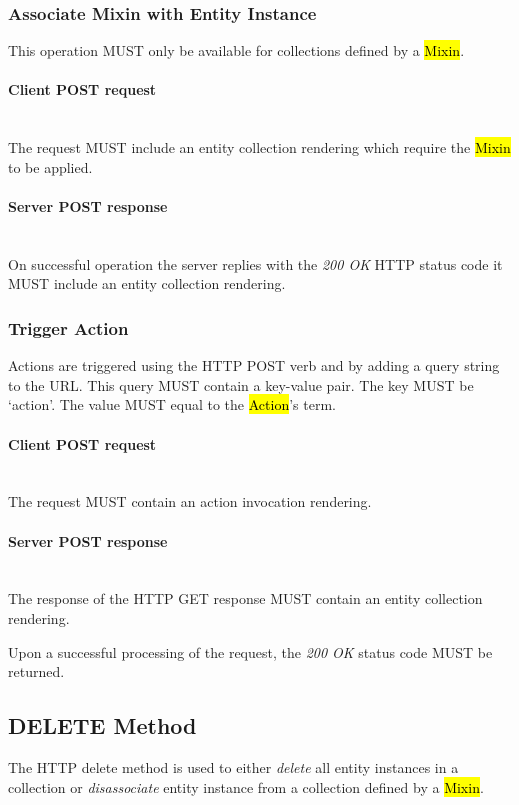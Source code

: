 \documentclass[10pt,a4paper]{article}
\begin{document}
\subsubsection{Associate Mixin with Entity Instance}
This operation MUST only be available for collections defined by a \hl{Mixin}.

\paragraph*{Client POST request}\hfill\\
The request MUST include an entity collection rendering which require the \hl{Mixin} to be applied.

\paragraph*{Server POST response}\hfill\\
On successful operation the server replies with the \emph{200 OK} HTTP status code it MUST include an entity collection rendering.

\subsubsection{Trigger Action}
Actions are triggered using the HTTP POST verb and by adding a query string to the URL.
This query MUST contain a key-value pair. The key MUST be `action'. The value MUST
equal to the \hl{Action}'s term.

\paragraph*{Client POST request}\hfill\\
The request MUST contain an action invocation rendering.

\paragraph*{Server POST response}\hfill\\
The response of the HTTP GET response MUST contain an entity collection rendering.

Upon a successful processing of the request, the \emph{200 OK} status code MUST be returned.

\subsection{DELETE Method}
The HTTP delete method is used to either {\em delete} all entity instances in
a collection or {\em disassociate} entity instance from a collection defined
by a \hl{Mixin}.
\end{document}

